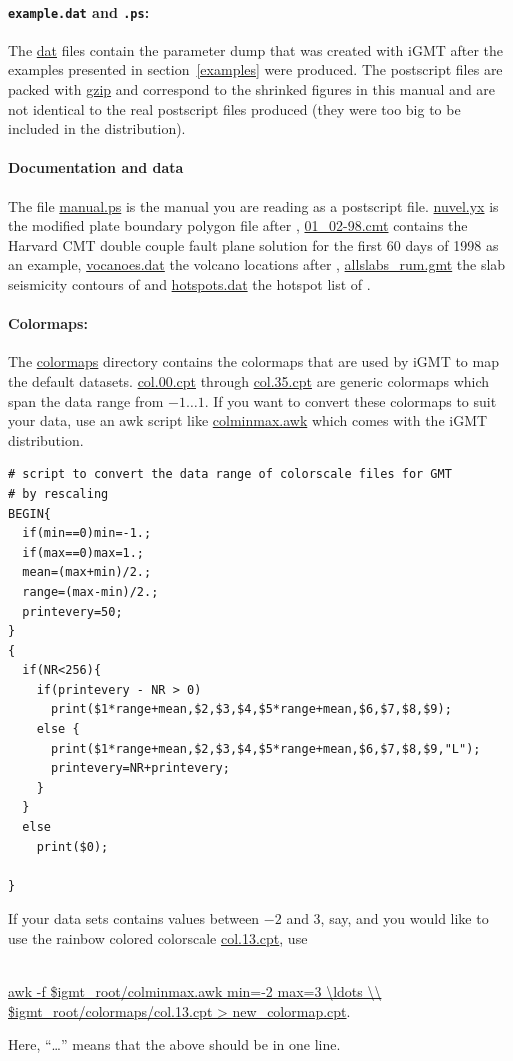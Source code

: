 \documentclass[11pt]{article}
\begin{document}
\paragraph{{\tt example.dat} and {\tt .ps}:} The \url{dat} files
contain the parameter dump that was created with iGMT after the
examples presented in section~\ref{examples} were produced. The
postscript files are packed with \url{gzip} and correspond to the
shrinked figures in this manual and are not identical to the real
postscript files produced (they were too big to be included in the
distribution).
\paragraph{Documentation and data}
The file \url{manual.ps} is the manual you are reading as a postscript
file.  \url{nuvel.yx} is the modified plate boundary polygon file
after \cite{demets90}, \url{01_02-98.cmt} contains the Harvard CMT
double couple fault plane solution for the first 60 days of 1998 as an
example, \url{vocanoes.dat} the volcano locations after
\cite{simkin94}, \url{allslabs_rum.gmt} the slab seismicity contours
of \cite{gudmundsson98} and \url{hotspots.dat} the hotspot list of
\cite{steinberger00b}.

\paragraph{Colormaps:} The \url{colormaps} directory contains the colormaps that are
used by iGMT to map the default datasets. \url{col.00.cpt} through
\url{col.35.cpt} are generic colormaps which span the data range from
$-1\ldots1$. If you want to convert these colormaps to suit your data,
use an awk script like \url{colminmax.awk} which comes with the iGMT
distribution.  \small
\begin{verbatim}
# script to convert the data range of colorscale files for GMT
# by rescaling
BEGIN{
  if(min==0)min=-1.;
  if(max==0)max=1.;
  mean=(max+min)/2.;
  range=(max-min)/2.;
  printevery=50;
}
{
  if(NR<256){
    if(printevery - NR > 0)
      print($1*range+mean,$2,$3,$4,$5*range+mean,$6,$7,$8,$9);
    else {
      print($1*range+mean,$2,$3,$4,$5*range+mean,$6,$7,$8,$9,"L");
      printevery=NR+printevery;
    }
  }
  else
    print($0);

}
\end{verbatim}
\normalsize
If your data sets contains values between $-2$ and 3, say, and you would like to use the
rainbow colored colorscale \url{col.13.cpt}, use\\\
\begin{center}
\url{awk -f $igmt_root/colminmax.awk min=-2 max=3 \ldots \\ $igmt_root/colormaps/col.13.cpt > new_colormap.cpt}. \\
\end{center}
Here, ``\ldots'' means that the above should be in one line.
\end{document}
